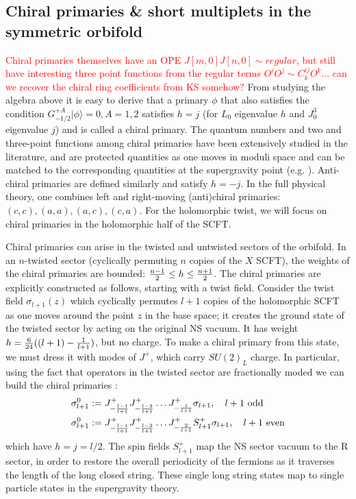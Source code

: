 \documentclass[../main.tex]{subfiles}
\begin{document}
\subsection{Chiral primaries \& short multiplets in the symmetric orbifold}
\textcolor{red}{Chiral primaries themselves have an OPE $J[m, 0]J[n, 0] \sim regular$, but still have interesting three point functions from the regular terms $O^i O^j \sim C^{ij}_k O^k$... can we recover the chiral ring coefficients from KS somehow?}
From studying the algebra above it is easy to derive that a primary $\phi$ that also satisfies the condition $G^{+ A}_{-1/2}|\phi \rangle = 0, A=1,2$ satisfies $h=j$ (for $L_0$ eigenvalue $h$ and $J_0^3$ eigenvalue $j$) and is called a chiral primary. The quantum numbers and two and three-point functions among chiral primaries have been extensively studied in the literature, and are protected quantities as one moves in moduli space and can be matched to the corresponding quantities at the supergravity point (e.g. \cite{}). Anti-chiral primaries are defined similarly and satisfy $h = -j$. In the full physical theory, one combines left and right-moving (anti)chiral primaries: $(c, c), (a,a), (a,c), (c, a)$. For the holomorphic twist, we will focus on chiral primaries in the holomorphic half of the SCFT. 

Chiral primaries can arise in the twisted and untwisted sectors of the orbifold. In an $n$-twisted sector (cyclically permuting $n$ copies of the $X$ SCFT), the weights of the chiral primaries are bounded: ${n-1 \over 2} \leq h \leq {n+1 \over 2}$. The chiral primaries are explicitly constructed as follows, starting with a twist field. Consider the twist field $\sigma_{l+1}(z)$ which cyclically permutes $l+1$ copies of the holomorphic SCFT as one moves around the point $z$ in the base space; it creates the ground state of the twisted sector by acting on the original NS vacuum. It has weight $h = {6 \over 24}( (l+ 1) - {1 \over l+1})$, but no charge. To make a chiral primary from this state, we must dress it with modes of $J^+$, which carry $SU(2)_L$ charge. In particular, using the fact that operators in the twisted sector are fractionally moded we can build the chiral primaries \cite{LuninMathur, LuninMathurSusy}:
\begin{align*}
\sigma^0_{l+1}&:=  J^+_{-{l-1 \over l+1}}J^{+}_{-{l-3 \over l+1}} \ldots J^+_{-{1 \over l+1}}\sigma_{l+1}, \ \ \ l+1 \text { odd} \\
\sigma^0_{l+1}&:= J^+_{-{l-1 \over l+1}}J^{+}_{-{l-3 \over l+1}} \ldots J^+_{-{2 \over l+1}}S^+_{l+1}\sigma_{l+1}, \ \ \ l+1 \text { even}
\end{align*} which have $h=j= l/2$. The spin fields $S^+_{l+1}$ map the NS sector vacuum to the R sector, in order to restore the overall periodicity of the fermions as it traverses the length of the long closed string. These single long string states map to single particle states in the supergravity theory. 
\end{document}

